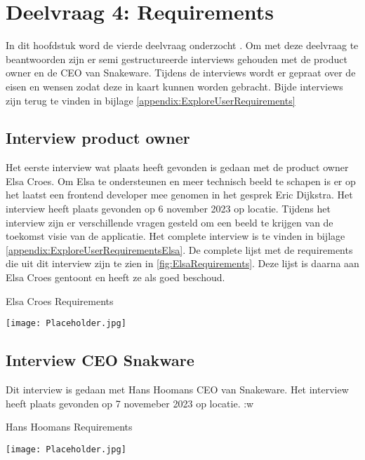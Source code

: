 \section{Deelvraag 4: Requirements}
In dit hoofdstuk word de vierde deelvraag onderzocht \SubquestionFour.
Om met deze deelvraag te beantwoorden zijn er semi gestructureerde interviews gehouden met de product owner en de CEO van Snakeware.
Tijdens de interviews wordt er gepraat over de eisen en wensen zodat deze in kaart kunnen worden gebracht.
Bijde interviews zijn terug te vinden in bijlage \ref{appendix:ExploreUserRequirements}

\subsection{Interview product owner}
Het eerste interview wat plaats heeft gevonden is gedaan met de product owner Elsa Croes.
Om Elsa te ondersteunen en meer technisch beeld te schapen is er op het laatst een frontend developer mee genomen in het gesprek Eric Dijkstra.
Het interview heeft plaats gevonden op 6 november 2023 op locatie.
Tijdens het interview zijn er verschillende vragen gesteld om een beeld te krijgen van de toekomst visie van de applicatie.
Het complete interview is te vinden in bijlage \ref{appendix:ExploreUserRequirementsElsa}.
De complete lijst met de requirements die uit dit interview zijn te zien in \ref{fig:ElsaRequirements}.
Deze lijst is daarna aan Elsa Croes gentoont en heeft ze als goed beschoud.

\whitespace
\begin{graphic}
    \captionsetup{type=figure}
    \caption{Elsa Croes Requirements}
    \texttt{[image: Placeholder.jpg]}
    \label{fig:ElsaRequirements}
\end{graphic}

\subsection{Interview CEO Snakware}
Dit interview is gedaan met Hans Hoomans CEO van Snakeware.
Het interview heeft plaats gevonden op 7 novemeber 2023 op locatie.
:w
\begin{graphic}
    \captionsetup{type=figure}
    \caption{Hans Hoomans Requirements}
    \texttt{[image: Placeholder.jpg]}
    \label{fig:HansRequirements}
\end{graphic}
